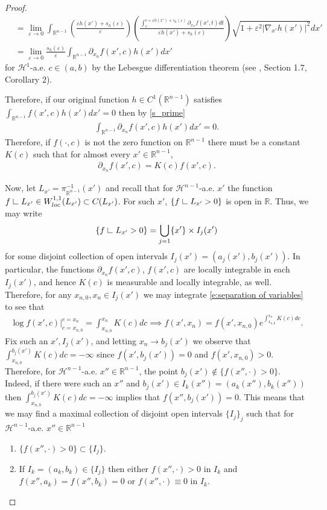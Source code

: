 \documentclass[12pt]{amsart}
\numberwithin{equation}{section}
\theoremstyle{plain}
\theoremstyle{definition}
\newcommand{\res}{\hbox{ {\vrule height .22cm}{\leaders\hrule\hskip.2cm} }}
\begin{document}
\begin{proof}
\begin{align*}
&=\lim_{\varepsilon\to 0}\int_{\mathbb{R}^{n-1}}\left(\frac{\varepsilon h(x')+s_h(\varepsilon)}{\varepsilon}\right)\left(\frac{\int_c^{c+\varepsilon h(x')+s_h(\varepsilon)}\partial_{x_n}f(x',t)dt}{\varepsilon h(x')+s_h(\varepsilon)}\right) \sqrt{1+ \varepsilon^2|\nabla_{x'}h(x')|^2}dx'\\
&=\lim_{\varepsilon \rightarrow 0} \frac{s_h(\varepsilon)}{\varepsilon}\int_{\mathbb{R}^{n-1}}\partial_{x_n}f(x',c)h(x') dx'
\end{align*}
for $\mathcal{H}^1$-a.e. $c\in (a,b)$ by the Lebesgue differentiation theorem (see \cite{evansgariepy}, Section 1.7, Corollary 2).

Therefore, if our original function $h \in C^1(\mathbb{R}^{n-1})$ satisfies $\int_{\mathbb{R}^{n-1}}f(x', c)h(x')dx' = 0$ then by \eqref{s_prime}
\begin{align*}
    \int_{\mathbb{R}^{n-1}}\partial_{x_n}f(x',c)h(x')dx' = 0.
\end{align*}
Therefore, if $f(\cdot, c)$ is not the zero function on $\mathbb{R}^{n-1}$ there must be a constant $K(c)$ such that for almost every $x' \in \mathbb{R}^{n-1}$,
\begin{align}\label{e:separation of variables}
\partial_{x_n}f(x',c) = K(c)f(x', c).
\end{align} 
 
Now, let $L_{x'} = \pi_{\mathbb{R}^{n-1}}^{-1}(x')$ and recall that for $\mathcal{H}^{n-1}$-a.e. $x'$ the function $f\res L_{x'} \in W^{1, 1}_{loc}(L_{x'}) \subset C(L_{x'})$. For such $x'$, $\{f \res L_{x'} >0\}$ is open in $\mathbb{R}$.  Thus, we may write 
$$\{f \res L_{x'}>0\} = \bigcup_{j=1}\{x'\} \times I_j(x')$$ for some disjoint collection of open intervals $I_j(x') = (a_j(x'), b_j(x'))$. In particular, the functions $\partial_{x_n}f(x',c)$, $f(x', c)$ are locally integrable in each $I_j(x')$, and hence $K(c)$ is measurable and locally integrable, as well. Therefore, for any $x_{n, 0}, x_n \in I_j(x')$ we may integrate \eqref{e:separation of variables} to see that 
\begin{align*}
\log f(x',c)\big|_{c=x_{n, 0}}^{c=x_n}=\int_{x_{n, 0}}^{x_n}K(c)dc\implies f(x',x_n) =f(x',x_{n, 0})e^{\int_{x_{n,0}}^{x_n}K(c)dc}.
\end{align*}
Fix such an $x', I_j(x')$, and letting $x_{n} \rightarrow b_j(x')$ we observe that $\int_{x_{n,0}}^{b_j(x')} K(c)dc = -\infty$ since $f(x',b_j(x'))=0$ and $f(x',x_{n, 0})>0$. Therefore, for $\mathcal{H}^{n-1}$-a.e. $x'' \in \mathbb{R}^{n-1}$, the point $b_j(x') \not \in \{f(x'', \cdot)>0\}$.  Indeed, if there were such an $x''$ and $b_j(x') \in I_k(x'') = (a_k(x''), b_k(x''))$ then $\int_{x_{n,0}}^{b_j(x')} K(c)dc = -\infty$ implies that $f(x'', b_j(x')) =0$.  This means that we may find a maximal collection of disjoint open intervals $\{I_j\}_j$ such that for $\mathcal{H}^{n-1}$-a.e. $x'' \in \mathbb{R}^{n-1}$
\begin{enumerate}
    \item $\{f(x'', \cdot)>0 \} \subset \{I_j\}$.
    \item If $I_k = (a_k, b_k) \in \{I_j\}$ then either $f(x'', \cdot)>0$ in $I_k$ and $f(x'', a_k) = f(x'', b_k)=0$ or $f(x'', \cdot)\equiv 0$ in $I_k$. 
\end{enumerate}


\end{proof}
\end{document}
